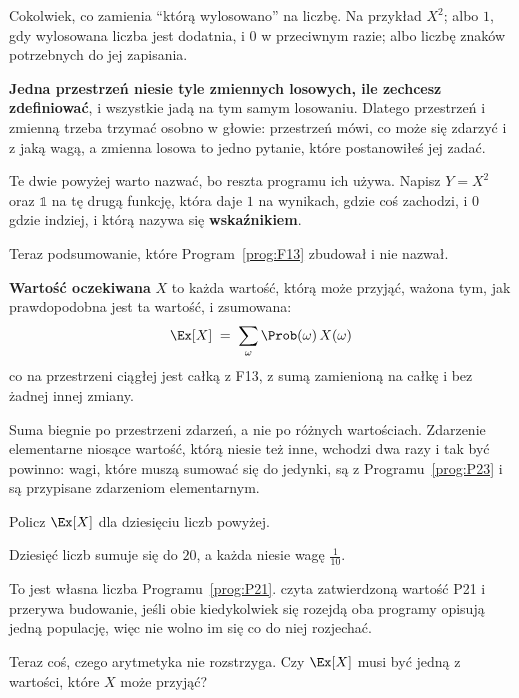 \begin{fr}
\begin{ansblock}
Cokolwiek, co zamienia \enquote{którą wylosowano} na liczbę. Na przykład
$X^{2}$; albo $1$, gdy wylosowana liczba jest dodatnia, i $0$ w przeciwnym
razie; albo liczbę znaków potrzebnych do jej zapisania.
\end{ansblock}

\textbf{Jedna przestrzeń niesie tyle zmiennych losowych, ile zechcesz
zdefiniować}, i wszystkie jadą na tym samym losowaniu. Dlatego przestrzeń i
zmienną trzeba trzymać osobno w głowie: przestrzeń mówi, co może się zdarzyć i
z jaką wagą, a zmienna losowa to jedno pytanie, które postanowiłeś jej zadać.

Te dwie powyżej warto nazwać, bo reszta programu ich używa. Napisz $Y = X^{2}$
oraz $\mathbb{1}$ na tę drugą \dash{} funkcję, która daje $1$ na wynikach,
gdzie coś zachodzi, i $0$ gdzie indziej, i którą nazywa się
\textbf{wskaźnikiem}.
\end{fr}

\begin{fr}
Teraz podsumowanie, które Program~\ref{prog:F13} zbudował i nie nazwał.

\textbf{Wartość oczekiwana} $X$ to każda wartość, którą może przyjąć,
ważona tym, jak prawdopodobna jest ta wartość, i zsumowana:
\[ \Ex[X] \;=\; \sum_{\omega} \Prob(\omega)\, X(\omega) \]
co na przestrzeni ciągłej jest całką z F13, z sumą zamienioną na całkę i bez
żadnej innej zmiany.

Suma biegnie po przestrzeni zdarzeń, a nie po różnych wartościach. Zdarzenie
elementarne niosące wartość, którą niesie też inne, wchodzi dwa razy i tak być
powinno: wagi, które muszą sumować się do jedynki, są z
Programu~\ref{prog:P23} i są przypisane zdarzeniom elementarnym.

Policz $\Ex[X]$ dla dziesięciu liczb powyżej.
\dotline
\nextframe
\end{fr}

\begin{fr}

Dziesięć liczb sumuje się do $20$, a każda niesie wagę $\frac{1}{10}$.

To jest własna liczba Programu~\ref{prog:P21}.
 czyta zatwierdzoną wartość P21 i przerywa
budowanie, jeśli obie kiedykolwiek się rozejdą \dash{} oba programy opisują
jedną populację, więc nie wolno im się co do niej rozjechać.

Teraz coś, czego arytmetyka nie rozstrzyga. Czy $\Ex[X]$ musi być jedną z
wartości, które $X$ może przyjąć?
\dotline
\nextframe
\end{fr}

